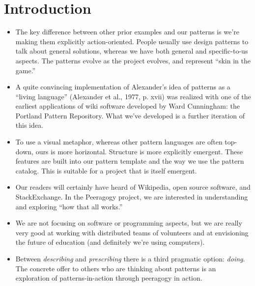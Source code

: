 \section{Introduction}

\begin{itemize}
\item The key difference between other prior examples and our
patterns is we're making them explicitly action-oriented.  People usually use design patterns to talk about general
solutions, whereas we have both general and specific-to-us aspects.
The patterns evolve as the project evolves, and represent ``skin in the game.''
\item A quite convincing implementation of Alexander’s idea of patterns as a “living language” (Alexander et
al., 1977, p. xvii) was realized with one of the earliest applications of wiki
software developed by Ward Cunningham: the Portland Pattern Repository.
What we've developed is a further iteration of this idea.
\item To use a visual metaphor, whereas other pattern languages are often top-down,
ours is more horizontal.  Structure is more explicitly emergent.  These features are built
into our pattern template and the way we use the pattern catalog.  This is suitable for a project
that is itself emergent.
\item Our readers will certainly have heard of Wikipedia, open source
software, and StackExchange.  In the Peeragogy project, we are interested in
understanding and exploring ``how that all works.''
\item We are not focusing on software or programming aspects, but we
are really very good at working with distributed teams of volunteers and
at envisioning the future of education (and definitely we're using
computers).
\item Between \emph{describing} and \emph{prescribing} there is a third pragmatic option: \emph{doing}.
The concrete offer to others who are thinking about patterns is an exploration of patterns-in-action
through peeragogy in action.
\end{itemize}